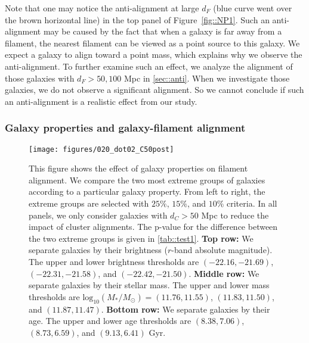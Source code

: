 \documentclass[usenatbib,useAMS]{mnras}
\theoremstyle{remark}
\newcommand{\jab}[1]{{\textcolor{red}{JAB: #1}}}
\begin{document}
{{Note that one may notice the anti-alignment at large $d_F$ (blue curve went over
the brown horizontal line) in the top panel of Figure~\ref{fig::NP1}. 
Such an anti-alignment may be caused by the fact that when a galaxy is far away from a filament, 
the nearest filament can be viewed as a point source to this galaxy. 
We expect a galaxy to align toward a point mass, which explains why we observe the anti-alignment.
To further examine such an effect, 
we analyze the alignment of those galaxies with $d_F>50, 100$ Mpc 
in \autoref{sec::anti}. 
When we investigate those galaxies, we do not observe a significant alignment.
So we cannot conclude if such an anti-alignment is a realistic effect from our study.
}





\subsubsection{Galaxy properties and galaxy-filament alignment}
\label{sec::property}


\begin{figure*}
\texttt{[image: figures/020\_dot02\_C50post]}
\caption{This figure shows the effect of galaxy properties on filament alignment. 
We compare the two most extreme groups of galaxies according to a particular galaxy property.
From left to right, the extreme groups are selected with $25\%$, $15\%$, and $10\%$ criteria. In all
panels, we only consider galaxies with $d_C > 50$ Mpc to reduce the impact of cluster alignments.
The p-value for the difference between the two extreme groups is given in \autoref{tab::test1}.
{\bf Top row:} We separate galaxies by their brightness ($r$-band absolute magnitude).
The upper and lower brightness thresholds are $(-22.16, -21.69)$, $(-22.31,-21.58)$, and $(-22.42,-21.50)$. 
{\bf Middle row:} We separate galaxies by their stellar mass.
The upper and lower mass thresholds are $\text{log}_{10}(M_*/M_\odot)=(11.76, 11.55)$, $(11.83,11.50)$, 
and $(11.87,11.47)$. 
{\bf Bottom row:} We separate galaxies by their age.
The upper and lower age thresholds are $(8.38, 7.06)$, $(8.73, 6.59)$, and $(9.13, 6.41)$ Gyr.
}
\label{fig::property}
\end{figure*}

}
\end{document}

